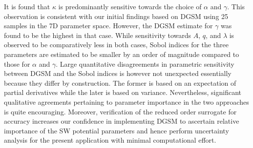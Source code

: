 It is found that $\kappa$ is predominantly sensitive towards the choice of $\alpha$ and
$\gamma$. This observation is consistent with our initial findings based on DGSM using 25 samples in the 7D
parameter space. However, the DGSM estimate for $\gamma$ was found to be the highest in that case. 
While sensitivity towards $A$, $q$, and $\lambda$ is observed to be comparatively less in both cases, Sobol
indices for the three parameters are estimated to be smaller by an order of magnitude compared to those
for $\alpha$ and $\gamma$. Large quantitative disagreements in parametric sensitivity between DGSM and the 
Sobol indices is however not unexpected essentially because they differ by construction. The former is based
on an expectation of partial derivatives while the later is based on variance. Nevertheless, significant qualitative
agreements pertaining to parameter importance in the two approaches is quite encouraging. 
Moreover, verification of the reduced order
surrogate for accuracy increases our confidence in implementing DGSM to ascertain relative importance of the
SW potential parameters and hence perform uncertainty analysis for the present application with minimal
computational effort. 


























